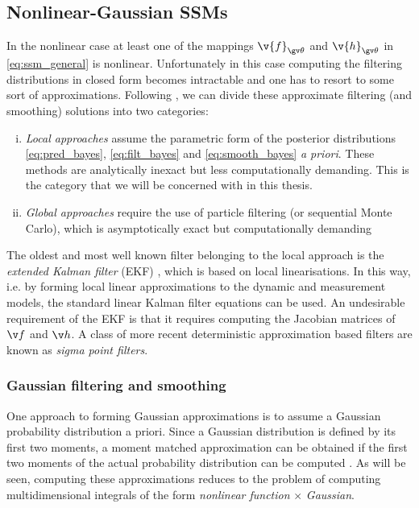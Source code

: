 \subsection{Nonlinear-Gaussian SSMs}%
\label{sec:nonlinear_state}
In the nonlinear case at least one of the mappings $\v{f}_{\Th}$ and $\v{h}_{\Th}$ in
\eqref{eq:ssm_general} is nonlinear. Unfortunately in this case computing the filtering
distributions in closed form becomes intractable and one has to resort to 
some sort of approximations. Following \textcite{Arasaratnam2009}, we can
divide these approximate filtering (and smoothing) solutions into two 
categories: 
\begin{enumerate}[i)] \addtolength{\leftskip}{.5cm} \itemsep1pt \parskip0pt 
  \item \emph{Local approaches} assume the parametric form of the posterior
  distributions \eqref{eq:pred_bayes}, \eqref{eq:filt_bayes} and \eqref{eq:smooth_bayes} \emph{a priori}. 
  These  methods are analytically inexact but less computationally demanding. This is the category that
we will be concerned with in this thesis. 
  \item \emph{Global approaches} require the use of particle filtering (or sequential Monte Carlo), 
  which is asymptotically exact but computationally demanding
\end{enumerate}

The oldest and most well known filter belonging to the local approach is
the \emph{extended Kalman filter} (EKF) \parencite{jazwinski2007stochastic}, which is based 
on local linearisations.
In this way, i.e. by forming local linear approximations to the dynamic
and measurement models, the standard linear Kalman filter equations can be used.
An undesirable requirement of the EKF is that it requires computing
the Jacobian matrices of $\f$ and $\h$. A class of more recent deterministic approximation
based filters are known as \emph{sigma point filters}. 

\subsubsection{Gaussian filtering and smoothing}

One approach to forming Gaussian approximations is to assume a Gaussian
probability distribution a priori. Since a Gaussian distribution is 
defined by its first two moments, a moment matched approximation
can be obtained if the first two moments of the actual probability
distribution can be computed \parencite{Ito2000,Sarkka2006}. As will
be seen, computing these approximations reduces to the problem
of computing multidimensional integrals of the form \emph{nonlinear function} $\times$ \emph{Gaussian}.

